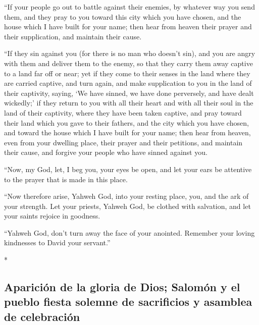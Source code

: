 \begin{paracol}{2}
\begin{otherlanguage}{english}
 ``If your people go out to battle against their enemies,
by whatever way you send them, and they pray to you toward this city
which you have chosen, and the house which I have built for your name;
 then hear from heaven their prayer and their
supplication, and maintain their cause.

 ``If they sin against you (for there is no man who
doesn't sin), and you are angry with them and deliver them to the enemy,
so that they carry them away captive to a land far off or near;
 yet if they come to their senses in the land where they
are carried captive, and turn again, and make supplication to you in the
land of their captivity, saying, `We have sinned, we have done
perversely, and have dealt wickedly;'  if they return to
you with all their heart and with all their soul in the land of their
captivity, where they have been taken captive, and pray toward their
land which you gave to their fathers, and the city which you have
chosen, and toward the house which I have built for your name;
 then hear from heaven, even from your dwelling place,
their prayer and their petitions, and maintain their cause, and forgive
your people who have sinned against you.

 ``Now, my God, let, I beg you, your eyes be open, and
let your ears be attentive to the prayer that is made in this place.

 ``Now therefore arise, Yahweh God, into your resting
place, you, and the ark of your strength. Let your priests, Yahweh God,
be clothed with salvation, and let your saints rejoice in goodness.

 ``Yahweh God, don't turn away the face of your anointed.
Remember your loving kindnesses to David your servant.''

\end{otherlanguage}

\switchcolumn[0]*

\hypertarget{apariciuxf3n-de-la-gloria-de-dios-salomuxf3n-y-el-pueblo-fiesta-solemne-de-sacrificios-y-asamblea-de-celebraciuxf3n}{%
\subsection{Aparición de la gloria de Dios; Salomón y el pueblo fiesta
solemne de sacrificios y asamblea de
celebración}\label{apariciuxf3n-de-la-gloria-de-dios-salomuxf3n-y-el-pueblo-fiesta-solemne-de-sacrificios-y-asamblea-de-celebraciuxf3n}}


\end{paracol}
